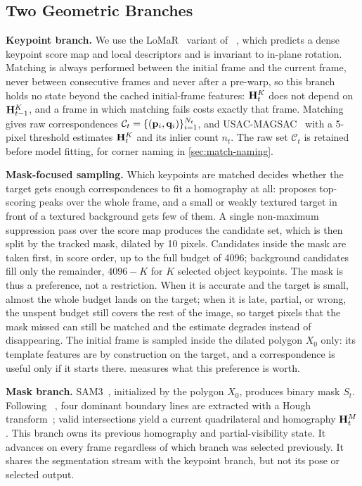 \documentclass[10pt,twocolumn,letterpaper]{article}
\begin{document}
\subsection{Two Geometric Branches}
\label{sec:two-branches}

\noindent\textbf{Keypoint branch.}
We use the LoMaR~\cite{nordstrom2026handles} variant of \loma~\cite{nordstrom2026loma}, which predicts a dense keypoint score map and local descriptors and is invariant to in-plane rotation.
Matching is always performed between the initial frame and the current frame, never between consecutive frames and never after a pre-warp, so this branch holds no state beyond the cached initial-frame features: $\mathbf{H}^{K}_t$ does not depend on $\mathbf{H}^{K}_{t-1}$, and a frame in which matching fails costs exactly that frame.
Matching gives raw correspondences $\mathcal{C}_t=\{(\mathbf{p}_i,\mathbf{q}_i)\}_{i=1}^{N_t}$, and USAC-MAGSAC~\cite{barath2020magsacpp} with a 5-pixel threshold estimates $\mathbf{H}^{K}_t$ and its inlier count $n_t$.
The raw set $\mathcal{C}_t$ is retained before model fitting, for corner naming in \cref{sec:match-naming}.

\noindent\textbf{Mask-focused sampling.}
Which keypoints are matched decides whether the target gets enough correspondences to fit a homography at all: \loma proposes top-scoring peaks over the whole frame, and a small or weakly textured target in front of a textured background gets few of them.
A single non-maximum suppression pass over the score map produces the candidate set, which is then split by the tracked mask, dilated by 10 pixels.
Candidates inside the mask are taken first, in score order, up to the full budget of 4096; background candidates fill only the remainder, $4096-K$ for $K$ selected object keypoints.
The mask is thus a preference, not a restriction.
When it is accurate and the target is small, almost the whole budget lands on the target; when it is late, partial, or wrong, the unspent budget still covers the rest of the image, so target pixels that the mask missed can still be matched and the estimate degrades instead of disappearing.
The initial frame is sampled inside the dilated polygon $X_0$ only: its template features are by construction on the target, and a correspondence is useful only if it starts there.
 measures what this preference is worth.

\noindent\textbf{Mask branch.}
SAM3~\cite{carion2025sam}, initialized by the polygon $X_0$, produces binary mask $S_t$.
Following \samh~\cite{serych2026woftsam}, four dominant boundary lines are extracted with a Hough transform~\cite{hough1962method,duda1972use}; valid intersections yield a current quadrilateral and homography $\mathbf{H}^{M}_t$.
This branch owns its previous homography and partial-visibility state.
It advances on every frame regardless of which branch was selected previously.
It shares the segmentation stream with the keypoint branch, but not its pose or selected output.
\end{document}
